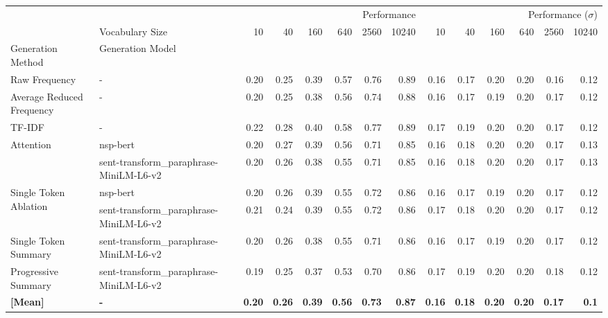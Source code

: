 \begin{tabular}{llrrrrrrrrrrrr}
\toprule
 &  & \multicolumn{6}{r}{Performance} & \multicolumn{6}{r}{Performance ($\sigma$)} \\
 & Vocabulary Size & 10 & 40 & 160 & 640 & 2560 & 10240 & 10 & 40 & 160 & 640 & 2560 & 10240 \\
Generation Method & Generation Model &  &  &  &  &  &  &  &  &  &  &  &  \\
\midrule
Raw Frequency & - & 0.20 & 0.25 & 0.39 & 0.57 & 0.76 & 0.89 & 0.16 & 0.17 & 0.20 & 0.20 & 0.16 & 0.12 \\
\cline{1-14}
Average Reduced Frequency & - & 0.20 & 0.25 & 0.38 & 0.56 & 0.74 & 0.88 & 0.16 & 0.17 & 0.19 & 0.20 & 0.17 & 0.12 \\
\cline{1-14}
TF-IDF & - & 0.22 & 0.28 & 0.40 & 0.58 & 0.77 & 0.89 & 0.17 & 0.19 & 0.20 & 0.20 & 0.17 & 0.12 \\
\cline{1-14}
\multirow[t]{2}{*}{Attention} & nsp-bert & 0.20 & 0.27 & 0.39 & 0.56 & 0.71 & 0.85 & 0.16 & 0.18 & 0.20 & 0.20 & 0.17 & 0.13 \\
 & sent-transform\_paraphrase-MiniLM-L6-v2 & 0.20 & 0.26 & 0.38 & 0.55 & 0.71 & 0.85 & 0.16 & 0.18 & 0.20 & 0.20 & 0.17 & 0.13 \\
\cline{1-14}
\multirow[t]{2}{*}{Single Token Ablation} & nsp-bert & 0.20 & 0.26 & 0.39 & 0.55 & 0.72 & 0.86 & 0.16 & 0.17 & 0.19 & 0.20 & 0.17 & 0.12 \\
 & sent-transform\_paraphrase-MiniLM-L6-v2 & 0.21 & 0.24 & 0.39 & 0.55 & 0.72 & 0.86 & 0.17 & 0.18 & 0.20 & 0.20 & 0.17 & 0.12 \\
\cline{1-14}
Single Token Summary & sent-transform\_paraphrase-MiniLM-L6-v2 & 0.20 & 0.26 & 0.38 & 0.55 & 0.71 & 0.86 & 0.16 & 0.17 & 0.19 & 0.20 & 0.17 & 0.12 \\
\cline{1-14}
Progressive Summary & sent-transform\_paraphrase-MiniLM-L6-v2 & 0.19 & 0.25 & 0.37 & 0.53 & 0.70 & 0.86 & 0.17 & 0.19 & 0.20 & 0.20 & 0.18 & 0.12 \\
\cline{1-14}
\midrule
\textbf{[Mean]} & \textbf{-} & \textbf{0.20} & \textbf{0.26} & \textbf{0.39} & \textbf{0.56} & \textbf{0.73} & \textbf{0.87} & \textbf{0.16} & \textbf{0.18} & \textbf{0.20} & \textbf{0.20} & \textbf{0.17} & \textbf{0.1} \\
\cline{1-14}
\bottomrule
\end{tabular}

